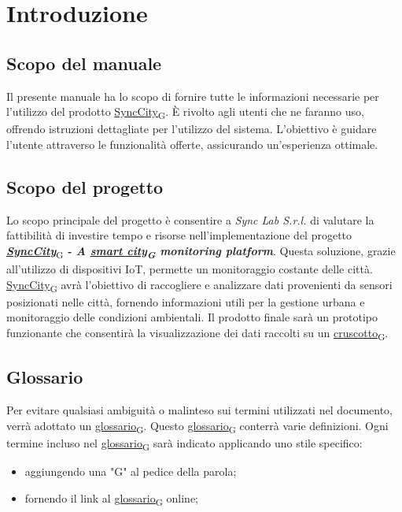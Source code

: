 \section{Introduzione}
\setcounter{subsection}{0}
\subsection{Scopo del manuale} %
Il presente manuale ha lo scopo di fornire tutte le informazioni necessarie per l’utilizzo del prodotto \href{https://7last.github.io/docs/pb/documentazione-interna/glossario\#synccity}{SyncCity\textsubscript{G}}. È rivolto agli utenti che ne faranno uso, offrendo istruzioni dettagliate per l’utilizzo del sistema. L’obiettivo è guidare l’utente attraverso le funzionalità offerte, assicurando un’esperienza ottimale.

\subsection{Scopo del progetto}
Lo scopo principale del progetto è consentire a \textit{Sync Lab S.r.l.} di valutare la fattibilità di investire tempo e risorse nell’implementazione del progetto \href{https://7last.github.io/docs/pb/documentazione-interna/glossario\#synccity}{\textit{\textbf{SyncCity}}}\textsubscript{G}\textbf{\textit{ - A \href{https://7last.github.io/docs/pb/documentazione-interna/glossario\#smart-city}{smart city\textsubscript{G}} monitoring platform}}. Questa soluzione, grazie all’utilizzo di dispositivi IoT, permette un monitoraggio costante delle città. \href{https://7last.github.io/docs/pb/documentazione-interna/glossario\#synccity}{SyncCity\textsubscript{G}} avrà l’obiettivo di raccogliere e analizzare dati provenienti da sensori posizionati nelle città, fornendo informazioni utili per la gestione urbana e monitoraggio delle condizioni ambientali. Il prodotto finale sarà un prototipo funzionante che consentirà la visualizzazione dei dati raccolti su un \href{https://7last.github.io/docs/pb/documentazione-interna/glossario\#cruscotto}{cruscotto\textsubscript{G}}.

\subsection{Glossario}
Per evitare qualsiasi ambiguità o malinteso sui termini utilizzati nel documento, verrà adottato un \href{https://7last.github.io/docs/pb/documentazione-interna/glossario\#glossario}{glossario\textsubscript{G}}. Questo \href{https://7last.github.io/docs/pb/documentazione-interna/glossario\#glossario}{glossario\textsubscript{G}} conterrà varie definizioni. Ogni termine incluso nel \href{https://7last.github.io/docs/pb/documentazione-interna/glossario\#glossario}{glossario\textsubscript{G}} sarà indicato applicando uno stile specifico:
\begin{itemize}
    \item aggiungendo una "G" al pedice della parola;
    \item fornendo il link al \href{https://7last.github.io/docs/pb/documentazione-interna/glossario\#glossario}{glossario\textsubscript{G}} online;
\end{itemize}

